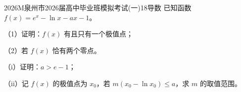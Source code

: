 
\begin{problem}{2026}{M}{泉州市2026届高中毕业班模拟考试(一)}{18}{导数}
已知函数 $f(x)=e^x-\ln x-ax-1$。

（1）证明：$f(x)$ 有且只有一个极值点；

（2）若 $f(x)$ 恰有两个零点。

\quad（i）证明：$a>e-1$；

\quad（ii）记 $f(x)$ 的极值点为 $x_0$，若 $m(x_0-\ln x_0)\leqslant a$，求 $m$ 的取值范围。
\end{problem}